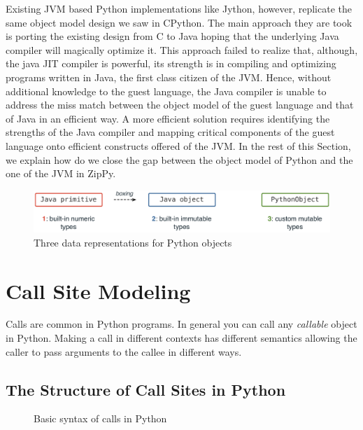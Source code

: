 Existing JVM based Python implementations like Jython, however, replicate the same object model design we saw in CPython.
The main approach they are took is porting the existing design from C to Java hoping that the underlying Java compiler will magically optimize it.
This approach failed to realize that, although, the java JIT compiler is powerful, its strength is in compiling and optimizing programs written in Java,
the first class citizen of the JVM.
Hence, without additional knowledge to the guest language, the Java compiler is unable to address the miss match between the object model of the guest language and that of Java in an efficient way.
A more efficient solution requires identifying the strengths of the Java compiler and mapping critical components of the guest language onto efficient constructs offered of the JVM.
In the rest of this Section, we explain how do we close the gap between the object model of Python and the one of the JVM in ZipPy.

\begin{figure}
\centering
\includegraphics[scale=.6]{figures/ch5-three-data-representations}
\caption{Three data representations for Python objects}
\label{fig:ch5-three-data-representations}
\end{figure}

\section{Call Site Modeling}

Calls are common in Python programs.
In general you can call any \emph{callable} object in Python.
Making a call in different contexts has different semantics allowing the caller to pass arguments to the callee in different ways.

\subsection{The Structure of Call Sites in Python}
\label{sec:ch5-structure-of-call-sites}

\begin{figure}
\centering
{}
\caption{Basic syntax of calls in Python}
\label{fig:ch5-call-site-synteax-code}
\end{figure}

